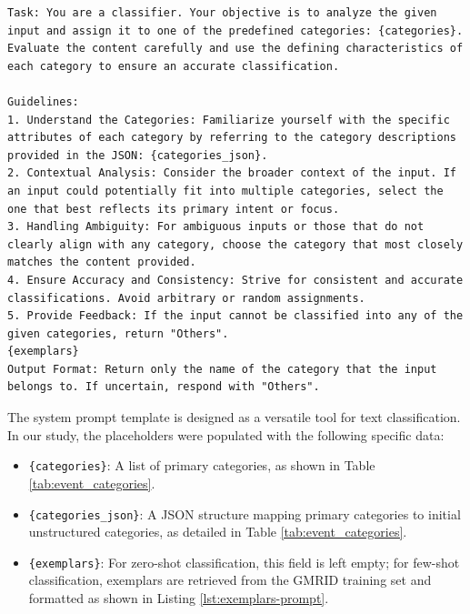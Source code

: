 \vspace{2.0\baselineskip}
\begin{lstlisting}[caption={Prompt for LLM Classification}, 
                   label={lst:llm-classification-prompt}, 
                   breaklines=true, 
                   basicstyle=\scriptsize\ttfamily, 
                   xleftmargin=0pt, 
                   framexleftmargin=0pt, 
                   framesep=0pt, 
                   aboveskip=0pt, 
                   belowskip=0pt, 
                   showspaces=false, 
                   showstringspaces=false,
                   keepspaces=true,
                   breakindent=0pt]
Task: You are a classifier. Your objective is to analyze the given input and assign it to one of the predefined categories: {categories}. Evaluate the content carefully and use the defining characteristics of each category to ensure an accurate classification.

Guidelines:
1. Understand the Categories: Familiarize yourself with the specific attributes of each category by referring to the category descriptions provided in the JSON: {categories_json}.
2. Contextual Analysis: Consider the broader context of the input. If an input could potentially fit into multiple categories, select the one that best reflects its primary intent or focus.
3. Handling Ambiguity: For ambiguous inputs or those that do not clearly align with any category, choose the category that most closely matches the content provided.
4. Ensure Accuracy and Consistency: Strive for consistent and accurate classifications. Avoid arbitrary or random assignments.
5. Provide Feedback: If the input cannot be classified into any of the given categories, return "Others".
{exemplars}
Output Format: Return only the name of the category that the input belongs to. If uncertain, respond with "Others".
\end{lstlisting}

The system prompt template is designed as a versatile tool for text classification. In our study, the placeholders were populated with the following specific data:

\begin{itemize}
    \item \texttt{\{categories\}}: A list of primary categories, as shown in Table \ref{tab:event_categories}.
    \item \texttt{\{categories\_json\}}: A JSON structure mapping primary categories to initial unstructured categories, as detailed in Table \ref{tab:event_categories}.
    \item \texttt{\{exemplars\}}: For zero-shot classification, this field is left empty; for few-shot classification, exemplars are retrieved from the GMRID training set and formatted as shown in Listing \ref{lst:exemplars-prompt}.
\end{itemize}


